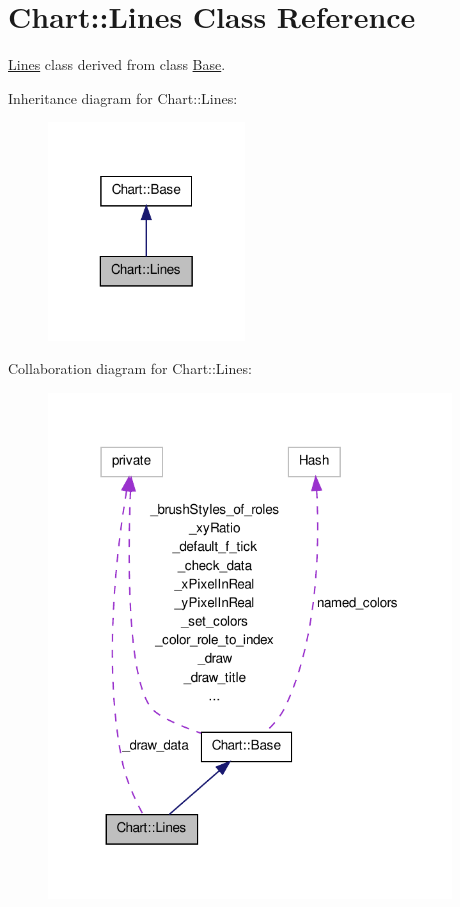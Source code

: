 \hypertarget{classChart_1_1Lines}{
\section{Chart::Lines Class Reference}
\label{classChart_1_1Lines}
}


\hyperlink{classChart_1_1Lines}{Lines} class derived from class \hyperlink{classChart_1_1Base}{Base}.  




Inheritance diagram for Chart::Lines:\nopagebreak
\begin{figure}[H]
\begin{center}
\leavevmode
\includegraphics[width=148pt]{classChart_1_1Lines__inherit__graph}
\end{center}
\end{figure}


Collaboration diagram for Chart::Lines:\nopagebreak
\begin{figure}[H]
\begin{center}
\leavevmode
\includegraphics[width=303pt]{classChart_1_1Lines__coll__graph}
\end{center}
\end{figure}
